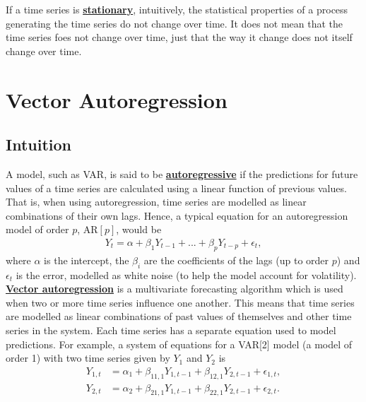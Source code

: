 \documentclass[11pt]{article}
\begin{document}
If a time series is \href{https://towardsdatascience.com/stationarity-in-time-series-analysis-90c94f27322}{\textbf{stationary}}, intuitively, the statistical properties of a process generating the time series do not change over time. It does not mean that the time series foes not change over time, just that the way it change does not itself change over time.

\pagebreak

\section{Vector Autoregression}

\subsection{Intuition}
A model, such as VAR, is said to be \href{https://www.machinelearningplus.com/time-series/vector-autoregression-examples-python/}{\textbf{autoregressive}} if the predictions for future values of a time series are calculated using a linear function of previous values. That is, when using autoregression, time series are modelled as linear combinations of their own lags. Hence, a typical equation for an autoregression model of order $p$, AR$[p]$, would be
\begin{align*}
	Y_t = \alpha + \beta_1 Y_{t-1} + ... + \beta_p Y_{t-p} + \epsilon_t,
\end{align*}
where $\alpha$ is the intercept, the $\beta_i$ are the coefficients of the lags (up to order $p$) and $\epsilon_t$ is the error, modelled as white noise (to help the model account for volatility).\\

\href{https://www.machinelearningplus.com/time-series/vector-autoregression-examples-python/}{\textbf{Vector autoregression}} is a multivariate forecasting algorithm which is used when two or more time series influence one another. This means that time series are modelled as linear combinations of past values of themselves and other time series in the system. Each time series has a separate equation used to model predictions. For example, a system of equations for a VAR[2] model (a model of order 1) with two time series given by $Y_1$ and $Y_2$ is
\begin{align*}
	Y_{1, t} &= \alpha_1 + \beta_{11, 1} Y_{1, t-1} + \beta_{12, 1} Y_{2, t-1} + \epsilon_{1, t}, \\
	Y_{2, t} &= \alpha_2 + \beta_{21, 1} Y_{1, t-1} + \beta_{22, 1} Y_{2, t-1} + \epsilon_{2, t}.
\end{align*} 
\end{document}
